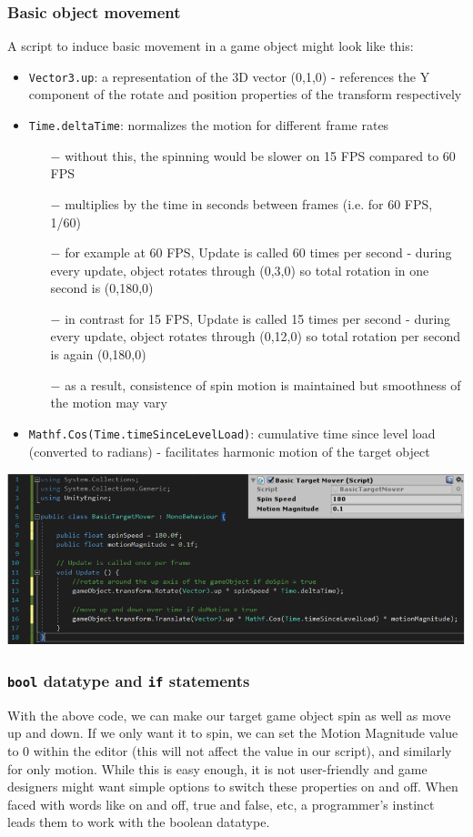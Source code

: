 \documentclass{article}[a4paper,12pt]
\theoremstyle{definition}
\begin{document}
\subsubsection{Basic object movement}
A script to induce basic movement in a game object might look like this:
\begin{itemize}
	\item \texttt{Vector3.up}: a representation of the 3D vector (0,1,0) - references the Y component of the rotate and position properties of the transform respectively
	\item \texttt{Time.deltaTime}: normalizes the motion for different frame rates
	\begin{itemize}
		\item[$-$] without this, the spinning would be slower on 15 FPS compared to 60 FPS
		\item[$-$] multiplies by the time in seconds between frames (i.e. for 60 FPS, 1/60)
		\item[$-$] for example at 60 FPS, Update is called 60 times per second - during every update, object rotates through (0,3,0) so total rotation in one second is (0,180,0)
		\item[$-$] in contrast for 15 FPS, Update is called 15 times per second - during every update, object rotates through (0,12,0) so total rotation per second is again (0,180,0)
		\item[$-$] as a result, consistence of spin motion is maintained but smoothness of the motion may vary	
	\end{itemize}
	\item \texttt{Mathf.Cos(Time.timeSinceLevelLoad)}: cumulative time since level load (converted to radians) - facilitates harmonic motion of the target object
\end{itemize}
\begin{center}\includegraphics[width=\textwidth]{basic_target_mover_float.png}\end{center}
\subsubsection{\texttt{bool} datatype and \texttt{if} statements}
With the above code, we can make our target game object spin as well as move up and down. If we only want it to spin, we can set the Motion Magnitude value to 0 within the editor (this will not affect the value in our script), and similarly for only motion. While this is easy enough, it is not user-friendly and game designers might want simple options to switch these properties on and off. When faced with words like on and off, true and false, etc, a programmer's instinct leads them to work with the boolean datatype.
\vspace{6pt}
\end{document}
